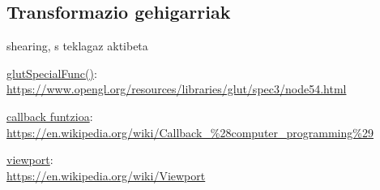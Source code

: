 \documentclass[12pt]{article}
\begin{document}
\subsection{Transformazio gehigarriak}


shearing, s teklagaz aktibeta

\pagebreak




\begin{thebibliography}{9}

\underline{glutSpecialFunc()}:\\
\url{https://www.opengl.org/resources/libraries/glut/spec3/node54.html}

\underline{callback funtzioa}:\\
\url{https://en.wikipedia.org/wiki/Callback_%28computer_programming%29}

\underline{viewport}:\\
\url{https://en.wikipedia.org/wiki/Viewport}

\end{thebibliography}
\end{document}

